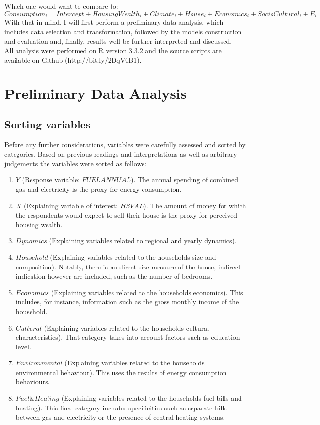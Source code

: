 \documentclass[12pt]{article}
\begin{document}
Which one would want to compare to:\\
$Consumption_{i} = Intercept + HousingWealth_i +Climate_i + House_i + Economics_i + SocioCultural_i + E_{i}$\\

With that in mind, I will first perform a preliminary data analysis, which includes data selection and transformation, followed by the models construction and evaluation and, finally, results well be further interpreted and discussed. \\

All analysis were performed on R version 3.3.2 and the source scripts are available on Github (http://bit.ly/2DqV0B1).\\

\section{Preliminary Data Analysis}
\subsection{Sorting variables}

Before any further considerations, variables were carefully assessed and sorted by categories. Based on previous readings and interpretations as well as arbitrary judgements the variables were sorted as follows:
\begin{enumerate}
\item $Y$ (Response variable: $FUELANNUAL$). The annual spending of combined gas and electricity is the proxy for energy consumption.
\item $X$ (Explaining variable of interest: $HSVAL$). The amount of money for which the respondents would expect to sell their house is the proxy for perceived housing wealth.
\item $Dynamics$ (Explaining variables related to regional and yearly dynamics).
\item $Household$ (Explaining variables related to the households size and composition). Notably, there is no direct size measure of the house, indirect indication however are included, such as the number of bedrooms.
\item $Economics$ (Explaining variables related to the households economics). This includes, for instance, information such as the gross monthly income of the household.
\item $Cultural$ (Explaining variables related to the households cultural characteristics). That category takes into account factors such as education level.
\item $Environmental$ (Explaining variables related to the households environmental behaviour). This uses the results of energy consumption behaviours.
\item $Fuel \& Heating$ (Explaining variables related to the households fuel bills and heating). This final category includes specificities such as separate bills between gas and electricity or the presence of central heating systems.
\end{enumerate}
\end{document}
